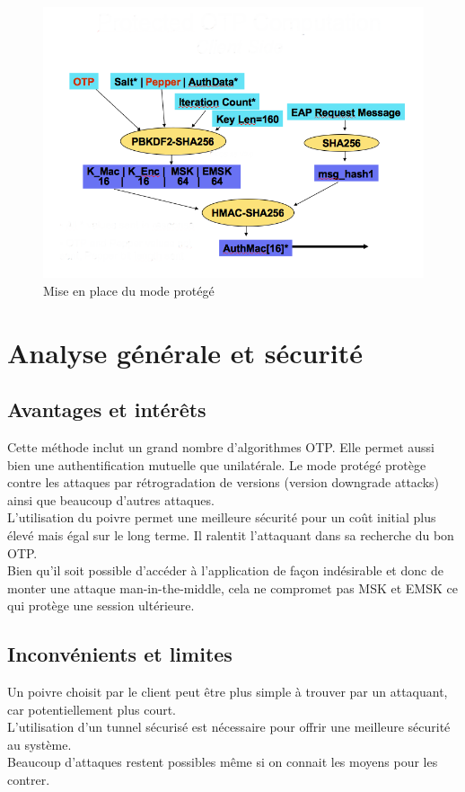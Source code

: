 \documentclass{../res/univ-projet}
\begin{document}
\begin{figure}[!h]
  \centering
  \includegraphics[width=400pt]{image3.png}
  \caption{Mise en place du mode protégé}
  \label{fig:image}
\end{figure}

\section{Analyse générale et sécurité}

\subsection{Avantages et intérêts}
  Cette méthode inclut un grand nombre d'algorithmes OTP.
  Elle permet aussi bien une authentification mutuelle que unilatérale.
  Le mode protégé protège contre les attaques par rétrogradation de versions (version downgrade attacks) ainsi que beaucoup d'autres attaques.\\
  L'utilisation du poivre permet une meilleure sécurité pour un coût initial plus élevé mais égal sur le long terme.
  Il ralentit l'attaquant dans sa recherche du bon OTP.\\
  
  Bien qu'il soit possible d'accéder à l'application de façon indésirable et donc de monter une attaque man-in-the-middle, cela ne compromet pas MSK et EMSK ce qui protège une session ultérieure.
  
  \subsection{Inconvénients et limites}
  Un poivre choisit par le client peut être plus simple à trouver par un attaquant, car potentiellement plus court.\\
  L'utilisation d'un tunnel sécurisé est nécessaire pour offrir une meilleure sécurité au système.\\
  Beaucoup d'attaques restent possibles même si on connait les moyens pour les contrer.
\end{document}
